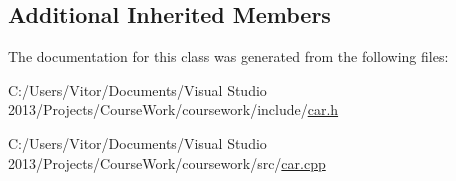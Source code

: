 \subsection*{Additional Inherited Members}


The documentation for this class was generated from the following files\+:\begin{DoxyCompactItemize}
\item 
C\+:/\+Users/\+Vitor/\+Documents/\+Visual Studio 2013/\+Projects/\+Course\+Work/coursework/include/\hyperlink{car_8h}{car.\+h}\item 
C\+:/\+Users/\+Vitor/\+Documents/\+Visual Studio 2013/\+Projects/\+Course\+Work/coursework/src/\hyperlink{car_8cpp}{car.\+cpp}\end{DoxyCompactItemize}
